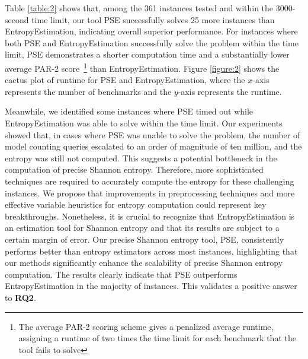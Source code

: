 Table \ref{table:2} shows that, among the 361 instances tested and within the 3000-second time limit, our tool PSE successfully solves 25 more instances than EntropyEstimation, indicating overall superior performance.
For instances where both PSE and EntropyEstimation successfully solve the problem within the time limit, PSE demonstrates a shorter computation time and a substantially lower average PAR-2 score~\footnote{The average PAR-2 scoring scheme gives a penalized average runtime, assigning a runtime of two times the time limit for each benchmark that the tool fails to solve} than EntropyEstimation.
Figure \ref{figure:2} shows the cactus plot of runtime for PSE and EntropyEstimation, where the $x$-axis represents the number of benchmarks and the $y$-axis represents the runtime.

Meanwhile, we identified some instances where PSE timed out while EntropyEstimation was able to solve within the time limit.
Our experiments showed that, in cases where PSE was unable to solve the problem, the number of model counting queries escalated to an order of magnitude of ten million, and the entropy was still not computed.
This suggests a potential bottleneck in the computation of precise Shannon entropy. Therefore, more sophisticated techniques are required to accurately compute the entropy for these challenging instances.
We propose that improvements in preprocessing techniques and more effective variable heuristics for entropy computation could represent key breakthroughs.
Nonetheless, it is crucial to recognize that EntropyEstimation is an estimation tool for Shannon entropy and that its results are subject to a certain margin of error.
Our precise Shannon entropy tool, PSE, consistently performs better than entropy estimators across most instances, highlighting that our methods significantly enhance the scalability of precise Shannon entropy computation.
The results clearly indicate that PSE outperforms EntropyEstimation in the majority of instances. This validates a positive answer to \textbf{RQ2}.



